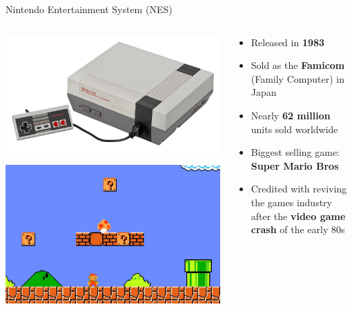 \begin{frame}{Nintendo Entertainment System (NES)}
	\begin{columns}
		\begin{column}{0.32\textwidth}
			\includegraphics[width=\textwidth]{nes}
			
			\includegraphics[width=\textwidth]{supermario}
		\end{column}
		\begin{column}{0.64\textwidth}
			\begin{itemize}
				\pause\item Released in \textbf{1983}
				\pause\item Sold as the \textbf{Famicom} (Family Computer) in Japan
				\pause\item Nearly \textbf{62 million} units sold worldwide
				\pause\item Biggest selling game: \textbf{Super Mario Bros}
				\pause\item Credited with reviving the games industry after the \textbf{video game crash} of the early 80s
			\end{itemize}
		\end{column}
	\end{columns}
\end{frame}

